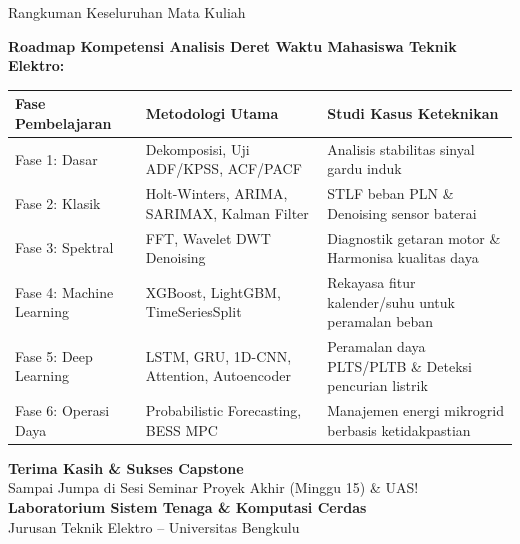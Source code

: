 \documentclass[aspectratio=169, 10pt]{beamer}
\begin{document}
\begin{frame}{Rangkuman Keseluruhan Mata Kuliah}
    \begin{center}
        \textbf{Roadmap Kompetensi Analisis Deret Waktu Mahasiswa Teknik Elektro:}
    \end{center}
    \begin{table}[h!]
    \centering
    \tiny
    \renewcommand{\arraystretch}{1.1}
    \begin{tabular}{|l|l|l|}
    \hline
    \rowcolor{tableheader}
    \color{white}\textbf{Fase Pembelajaran} & \color{white}\textbf{Metodologi Utama} & \color{white}\textbf{Studi Kasus Keteknikan} \\ \hline
    Fase 1: Dasar & Dekomposisi, Uji ADF/KPSS, ACF/PACF & Analisis stabilitas sinyal gardu induk \\ \hline
    Fase 2: Klasik & Holt-Winters, ARIMA, SARIMAX, Kalman Filter & STLF beban PLN \& Denoising sensor baterai \\ \hline
    Fase 3: Spektral & FFT, Wavelet DWT Denoising & Diagnostik getaran motor \& Harmonisa kualitas daya \\ \hline
    Fase 4: Machine Learning & XGBoost, LightGBM, TimeSeriesSplit & Rekayasa fitur kalender/suhu untuk peramalan beban \\ \hline
    Fase 5: Deep Learning & LSTM, GRU, 1D-CNN, Attention, Autoencoder & Peramalan daya PLTS/PLTB \& Deteksi pencurian listrik \\ \hline
    Fase 6: Operasi Daya & Probabilistic Forecasting, BESS MPC & Manajemen energi mikrogrid berbasis ketidakpastian \\ \hline
    \end{tabular}
    \end{table}
\end{frame}

\begin{frame}[plain]
    \begin{center}
        \vspace{1.5cm}
        {\Huge \color{mainblue} \textbf{Terima Kasih \& Sukses Capstone}}\\[0.4cm]
        {\large Sampai Jumpa di Sesi Seminar Proyek Akhir (Minggu 15) \& UAS!}\\[1.2cm]
        \textbf{Laboratorium Sistem Tenaga \& Komputasi Cerdas}\\
        Jurusan Teknik Elektro -- Universitas Bengkulu
    \end{center}
\end{frame}
\end{document}
